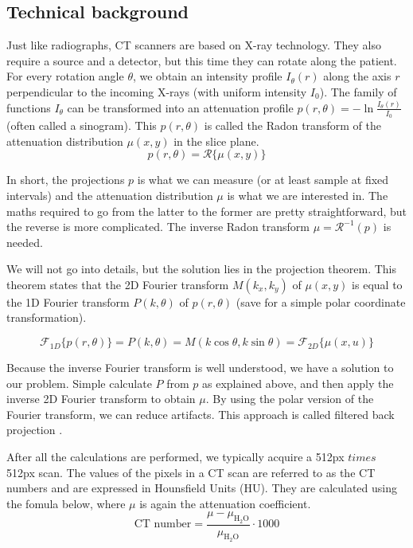 \subsection{Technical background}
Just like radiographs, CT scanners are based on X-ray technology. They also
require a source and a detector, but this time they can rotate along the
patient. For every rotation angle $\theta$, we obtain an intensity profile
$I_\theta(r)$ along the axis $r$ perpendicular to the incoming X-rays (with
uniform intensity $I_0$). The family of functions $I_\theta$ can be transformed
into an attenuation profile $p(r, \theta) = -\ln \tfrac{I_\theta(r)}{I_0}$
(often called a sinogram). This $p(r, \theta)$ is called the Radon transform of
the attenuation distribution $\mu(x,y)$ in the slice plane.
\begin{equation}
	p(r, \theta) = \mathscr{R}\{ \mu(x,y) \}
\end{equation}

In short, the projections $p$ is what we can measure (or at least sample at
fixed intervals) and the attenuation distribution $\mu$ is what we are
interested in. The maths required to go from the latter to the former are pretty
straightforward, but the reverse is more complicated. The inverse Radon
transform $\mu = \mathscr{R}^{-1}(p)$ is needed.

We will not go into details, but the solution lies in the projection theorem.
This theorem states that the 2D Fourier transform $M(k_x, k_y)$ of $\mu(x,y)$
is equal to the 1D Fourier transform $P(k, \theta)$ of $p(r, \theta)$ (save for
a simple polar coordinate transformation).

\begin{equation}
\mathscr{F}_{1D}\{ p(r, \theta) \} = P(k, \theta) = M(k \cos \theta, k \sin
\theta) = \mathscr{F}_{2D}\{ \mu(x, u) \}
\end{equation}

Because the inverse Fourier transform is well understood, we have a solution to
our problem. Simple calculate $P$ from $p$ as explained above, and then apply
the inverse 2D Fourier transform to obtain $\mu$. By using the polar version of
the Fourier transform, we can reduce artifacts. This approach is called filtered
back projection \cite{suetens}.

After all the calculations are performed, we typically acquire a 512px $times$
512px scan. The values of the pixels in a CT scan are referred to as the CT
numbers and are expressed in Hounsfield Units (HU). They are calculated using
the fomula below, where $\mu$ is again the attenuation coefficient.
\begin{equation}
	\text{CT number} = \frac{\mu -
	\mu_{\text{H}_2\text{O}}}{\mu_{\text{H}_2\text{O}}} \cdot 1000
\end{equation}

